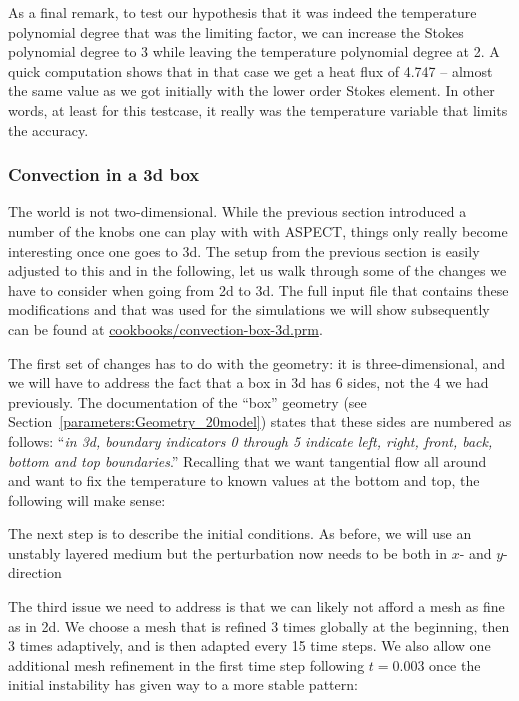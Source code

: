 \documentclass{article}
\newcommand{\aspect}{\textsc{ASPECT}}
\begin{document}
As a final remark, to test our hypothesis that it was indeed the temperature
polynomial degree that was the limiting factor, we can increase the Stokes
polynomial degree to 3 while leaving the temperature polynomial degree at 2. A
quick computation shows that in that case we get a heat flux of 4.747 -- almost 
the same value as we got initially with the lower order Stokes element. In other
words, at least for this testcase, it really was the temperature variable that
limits the accuracy.


\subsubsection{Convection in a 3d box}
\label{sec:cookbooks-simple-box-3d}

The world is not two-dimensional. While the previous section introduced a number
of the knobs one can play with with \aspect{}, things only really become
interesting once one goes to 3d. The setup from the previous section is easily
adjusted to this and in the following, let us walk through some of the changes
we have to consider when going from 2d to 3d. The full input file that
contains these modifications and that was used for the simulations we will show
subsequently can be found at \url{cookbooks/convection-box-3d.prm}.

The first set of changes has to do with the geometry: it is three-dimensional,
and we will have to address the fact that a box in 3d has 6 sides, not the 4 we
had previously. The documentation of the ``box'' geometry
(see Section~\ref{parameters:Geometry_20model}) states that these sides are
numbered as follows: ``\textit{in 3d, boundary indicators 0 through 5 indicate
left, right, front, back, bottom and top boundaries}.'' Recalling that we want
tangential flow all around and want to fix the temperature to known values at
the bottom and top, the following will make sense:



The next step is to describe the initial conditions. As before, we will use an
unstably layered medium but the perturbation now needs to be both in $x$- and
$y$-direction


The third issue we need to address is that we can likely not afford a mesh as
fine as in 2d. We choose a mesh that is refined 3 times globally at the
beginning, then 3 times adaptively, and is then adapted every 15 time steps. We
also allow one additional mesh refinement in the first time step following
$t=0.003$ once the initial instability has given way to a more stable pattern:

\end{document}
